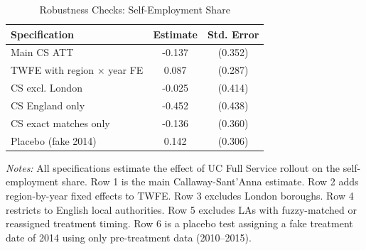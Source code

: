 
\begin{table}[htbp]
\centering
\caption{Robustness Checks: Self-Employment Share}
\label{tab:robustness}
\begin{tabular}{lcc}
\toprule
Specification & Estimate & Std. Error \\
\midrule
Main CS ATT & -0.137 & (0.352) \\
TWFE with region × year FE & 0.087 & (0.287) \\
CS excl. London & -0.025 & (0.414) \\
CS England only & -0.452 & (0.438) \\
CS exact matches only & -0.136 & (0.360) \\
Placebo (fake 2014) & 0.142 & (0.306) \\

\bottomrule
\end{tabular}
\begin{tablenotes}
\small
\item \textit{Notes:} All specifications estimate the effect of UC Full Service rollout on the self-employment share. Row 1 is the main Callaway-Sant'Anna estimate. Row 2 adds region-by-year fixed effects to TWFE. Row 3 excludes London boroughs. Row 4 restricts to English local authorities. Row 5 excludes LAs with fuzzy-matched or reassigned treatment timing. Row 6 is a placebo test assigning a fake treatment date of 2014 using only pre-treatment data (2010--2015).
\end{tablenotes}
\end{table}


